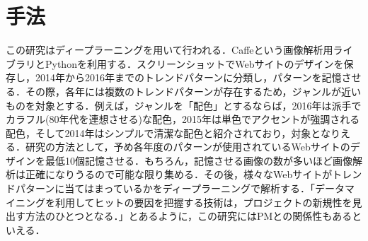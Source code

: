 \documentclass[uplatex,twocolumn,dvipdfmx]{jsarticle}
\begin{document}
\section{手法}
この研究はディープラーニングを用いて行われる．Caffeという画像解析用ライブラリとPythonを利用する．スクリーンショットでWebサイトのデザインを保存し，2014年から2016年までのトレンドパターンに分類し，パターンを記憶させる．その際，各年には複数のトレンドパターンが存在するため，ジャンルが近いものを対象とする．例えば，ジャンルを「配色」とするならば，2016年は派手でカラフル(80年代を連想させる)な配色，2015年は単色でアクセントが強調される配色，そして2014年はシンプルで清潔な配色と紹介されており，対象となりえる．研究の方法として，予め各年度のパターンが使用されているWebサイトのデザインを最低10個記憶させる．もちろん，記憶させる画像の数が多いほど画像解析は正確になりうるので可能な限り集める．その後，様々なWebサイトがトレンドパターンに当てはまっているかをディープラーニングで解析する．「データマイニングを利用してヒットの要因を把握する技術は，プロジェクトの新規性を見出す方法のひとつとなる\cite{bib003}．」とあるように，この研究にはPMとの関係性もあるといえる．



\end{document}
